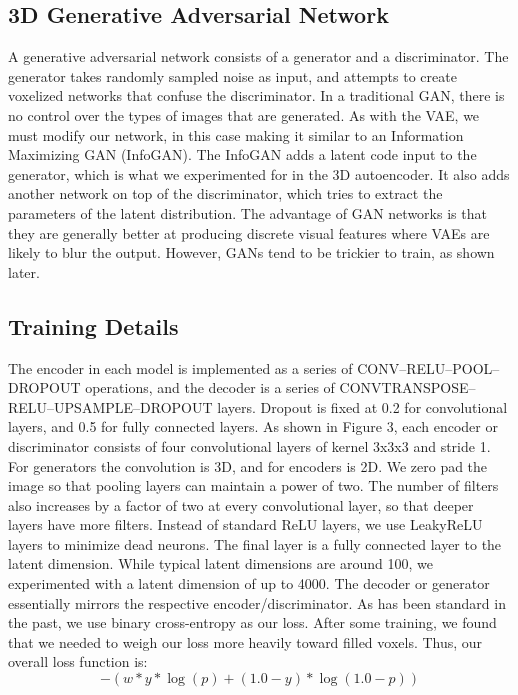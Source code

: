 \documentclass[conference, 10pt]{IEEEtran}
\begin{document}
\subsection{3D Generative Adversarial Network}

A generative adversarial network consists of a generator and a discriminator. The generator takes randomly sampled noise as input, and attempts to create voxelized networks that confuse the discriminator. In a traditional GAN, there is no control over the types of images that are generated. As with the VAE, we must modify our network, in this case making it similar to an Information Maximizing GAN (InfoGAN). The InfoGAN adds a latent code input to the generator, which is what we experimented for in the 3D autoencoder. It also adds another network on top of the discriminator, which tries to extract the parameters of the latent distribution. The advantage of GAN networks is that they are generally better at producing discrete visual features where VAEs are likely to blur the output. However, GANs tend to be trickier to train, as shown later.

    
\subsection{Training Details}


The encoder in each model is implemented as a series of CONV–RELU–POOL–DROPOUT operations, and the decoder is a series of CONVTRANSPOSE–RELU–UPSAMPLE–DROPOUT layers. Dropout is fixed at 0.2 for convolutional layers, and 0.5 for fully connected layers. As shown in Figure 3, each encoder or discriminator consists of four convolutional layers of kernel 3x3x3 and stride 1. For generators the convolution is 3D, and for encoders is 2D. We zero pad the image so that pooling layers can maintain a power of two. The number of filters also increases by a factor of two at every convolutional layer, so that deeper layers have more filters. Instead of standard ReLU layers, we use LeakyReLU layers to minimize dead neurons. The final layer is a fully connected layer to the latent dimension. While typical latent dimensions are around 100, we experimented with a latent dimension of up to 4000. The decoder or generator essentially mirrors the respective encoder/discriminator. As has been standard in the past, we use binary cross-entropy as our loss. After some training, we found that we needed to weigh our loss more heavily toward filled voxels. Thus, our overall loss function is:
\begin{equation}
-(w * y * \log (p) + (1.0 - y) * \log (1.0 - p))
\end{equation}
\end{document}
